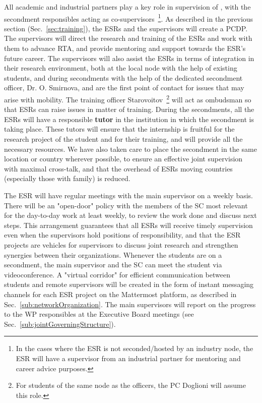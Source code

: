 

All academic and industrial partners play a key role in supervision of \acronym, with the secondment responsibles acting as co-supervisors~\footnote{In the cases where the ESR is not seconded/hosted by an industry node, the ESR will have a supervisor from an industrial partner for mentoring and career advice purposes.}.
As described in the previous section (Sec.~\ref{sec:training}), the ESRs and the supervisors will create a PCDP.  
The supervisors will direct the research and training of the ESRs and work with them to advance RTA, and provide mentoring and support towards the ESR's future career. 
The supervisors will also assist the ESRs in terms of integration in their research environment, both at the local node with the help of existing students, and during secondments with the help of the dedicated secondment officer, Dr. O. Smirnova, and are the first point of contact for issues that may arise with mobility. 
The training officer Starovoitov~\footnote{For students of the same node as the officers, the PC Doglioni will assume this role.} will act as ombudsman so that ESRs can raise issues in matter of training. 
During the secondments, all the ESRs will have a responsible \textbf{tutor} in the institution in which the secondment is taking place. These tutors will ensure that the internship is fruitful for the research project of the student and for their training, and will provide all the necessary resources. 
We have also taken care to place the secondment in the same location or country wherever possible, to ensure an effective joint supervision with maximal cross-talk, and that the overhead of ESRs moving countries (especially those with family) is reduced. 

The ESR will have regular meetings with the main supervisor on a weekly basis. 
There will be an "open-door" policy with the members of the SC most relevant for the day-to-day work at least weekly, to review the work done and discuss next steps. 
This arrangement guarantees that all ESRs will receive timely supervision even when the supervisors hold positions of responsibility, and that the ESR projects are vehicles for supervisors to discuss joint research and strengthen synergies between their organizations.  
Whenever the students are on a secondment, the main supervisor and the SC can meet the student via videoconference. 
A "virtual corridor" for efficient communication between students and remote supervisors will be created in the form of instant messaging channels for each ESR project on the Mattermost platform, as described in Sec.~\ref{sub:networkOrganization}. 
The main supervisors will report on the progress to the WP responsibles at the Executive Board meetings (see Sec.~\ref{sub:jointGoverningStructure}). 

